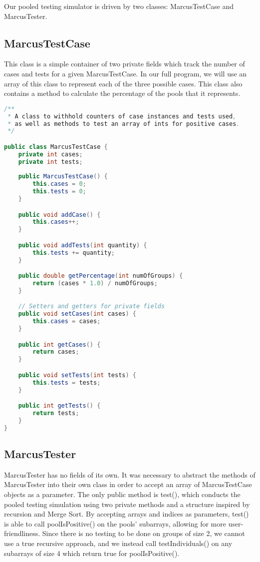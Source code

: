 \documentclass[letterpaper, 10pt]{article}
\begin{document}
\hspace{1.0em}Our pooled testing simulator is driven by two classes: MarcusTestCase and MarcusTester.

\subsection{MarcusTestCase}

\hspace{1.0em}This class is a simple container of two private fields which track the number of cases and tests for a given MarcusTestCase. In our full program, we will use an array of this class to represent each of the three possible cases. This class also contains a method to calculate the percentage of the pools that it represents.

\begin{lstlisting}[language=Java, firstnumber=1]
/**
 * A class to withhold counters of case instances and tests used,
 * as well as methods to test an array of ints for positive cases.
 */

public class MarcusTestCase {
    private int cases;
    private int tests;
    
    public MarcusTestCase() {
        this.cases = 0;
        this.tests = 0;
    }

    public void addCase() {
        this.cases++;
    }

    public void addTests(int quantity) {
        this.tests += quantity;
    }

    public double getPercentage(int numOfGroups) {
        return (cases * 1.0) / numOfGroups;
    }

    // Setters and getters for private fields
    public void setCases(int cases) {
        this.cases = cases;
    }

    public int getCases() {
        return cases;
    }

    public void setTests(int tests) {
        this.tests = tests;
    }

    public int getTests() {
        return tests;
    }
}
\end{lstlisting}

\subsection{MarcusTester}

\hspace{1.0em}MarcusTester has no fields of its own. It was necessary to abstract the methods of MarcusTester into their own class in order to accept an array of MarcusTestCase objects as a parameter. The only public method is test(), which conducts the pooled testing simulation using two private methods and a structure inspired by recursion and Merge Sort. By accepting arrays and indices as parameters, test() is able to call poolIsPositive() on the pools' subarrays, allowing for more user-friendliness. Since there is no testing to be done on groups of size 2, we cannot use a true recursive approach, and we instead call testIndividuals() on any subarrays of size 4 which return true for poolIsPositive().
\end{document}
